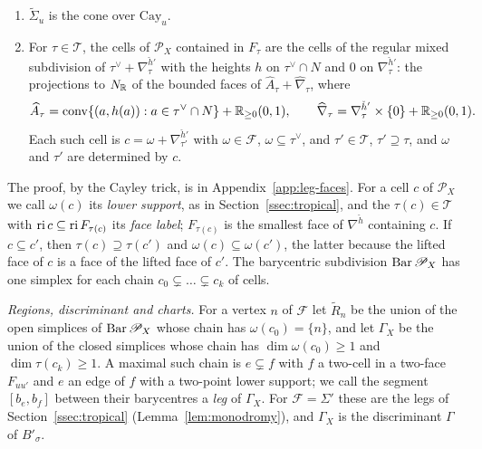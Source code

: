 \begin{lemma}\label{lem:cayley}
\begin{enumerate}
\item $\widetilde\Sigma_u$ is the cone over $\mathrm{Cay}_u$.
\item For $\tau\in\mathcal T$, the cells of $\mathscr P_X$ contained in $F_\tau$ are the cells of the regular mixed
subdivision of $\tau^\vee+\nabla^{\check h'}_\tau$ with the heights $h$ on $\tau^\vee\cap N$ and $0$ on
$\nabla^{\check h'}_\tau$: the projections to $N_\mathbb R$ of the bounded faces of $\widehat A_\tau+\widehat\nabla_\tau$, where
\[
\widehat A_\tau=\operatorname{conv}\{(a,h(a)):a\in\tau^\vee\cap N\}+\mathbb R_{\ge0}(0,1),\qquad
\widehat\nabla_\tau=\nabla^{\check h'}_\tau\times\{0\}+\mathbb R_{\ge0}(0,1).
\]
Each such cell is $c=\omega+\nabla^{\check h'}_{\tau'}$ with $\omega\in\mathcal F$, $\omega\subseteq\tau^\vee$, and
$\tau'\in\mathcal T$, $\tau'\supseteq\tau$, and $\omega$ and $\tau'$ are determined by $c$.
\end{enumerate}
\end{lemma}
The proof, by the Cayley trick, is in Appendix~\ref{app:leg-faces}. For a cell $c$ of $\mathscr P_X$ we call $\omega(c)$
its \emph{lower support}, as in Section~\ref{ssec:tropical}, and the $\tau(c)\in\mathcal T$ with $\operatorname{ri}
c\subseteq\operatorname{ri} F_{\tau(c)}$ its \emph{face label}; $F_{\tau(c)}$ is the smallest face of $\nabla^{\check h}$ containing
$c$. If $c\subseteq c'$, then $\tau(c)\supseteq\tau(c')$ and $\omega(c)\subseteq\omega(c')$, the latter because the lifted
face of $c$ is a face of the lifted face of $c'$. The barycentric subdivision $\operatorname{Bar}\mathscr P_X$ has one simplex for
each chain $c_0\subsetneq\dots\subsetneq c_k$ of cells.

\emph{Regions, discriminant and charts.} For a vertex $n$ of $\mathcal F$ let $\widetilde R_n$ be the union of the open
simplices of $\operatorname{Bar}\mathscr P_X$ whose chain has $\omega(c_0)=\{n\}$, and let $\Gamma_X$ be the union of the closed
simplices whose chain has $\dim\omega(c_0)\ge1$ and $\dim\tau(c_k)\ge1$. A maximal such chain is $e\subsetneq f$ with $f$
a two-cell in a two-face $F_{uu'}$ and $e$ an edge of $f$ with a two-point lower support; we call the segment
$[b_e,b_f]$ between their barycentres a \emph{leg} of $\Gamma_X$. For $\mathcal F=\Sigma'$ these are the legs of
Section~\ref{ssec:tropical} (Lemma~\ref{lem:monodromy}), and $\Gamma_X$ is the discriminant $\Gamma$ of $B'_\sigma$.

